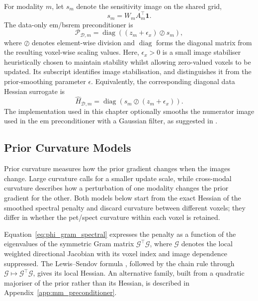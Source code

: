 For modality $m$, let $s_m$ denote the sensitivity image on the shared grid,
\begin{equation}
    s_m
    =
    W_m A_m^\top \bm 1.
    \label{eq:shared_grid_sensitivity}
\end{equation}
The data-only \gls{em}/\gls{bsrem} preconditioner is
\begin{equation}
    \mathcal{P}_{\mathcal D,m}
    =
    \operatorname{diag}\!\left((z_m+\epsilon_x)\oslash s_m\right),
    \label{eq:bsrem_preconditioner}
\end{equation}
where $\oslash$ denotes element-wise division and $\operatorname{diag}$ forms the diagonal matrix from the resulting voxel-wise scaling values. Here, $\epsilon_x>0$ is a small image stabiliser heuristically chosen to maintain stability whilst allowing zero-valued voxels to be updated. Its subscript identifies image stabilisation, and distinguishes it from the prior-smoothing parameter $\epsilon$. Equivalently, the corresponding diagonal data Hessian surrogate is
\begin{equation}
    \widehat H_{\mathcal D,m}
    =
    \operatorname{diag}\!\left(s_m \oslash (z_m+\epsilon_x)\right).
    \label{eq:data_hessian_surrogate}
\end{equation}
The implementation used in this chapter optionally smooths the numerator image used in the \gls{em} preconditioner with a Gaussian filter, as suggested in \cite{ehrhardtFastPETReconstruction2025a}.

\subsection{Prior Curvature Models}
\label{subsec:optimisation_prior_preconditioning}

Prior curvature measures how the prior gradient changes when the images change. Large curvature calls for a smaller update scale, while cross-modal curvature describes how a perturbation of one modality changes the prior gradient for the other. Both models below start from the exact Hessian of the smoothed spectral penalty and discard curvature between different voxels; they differ in whether the \gls{pet}/\gls{spect} curvature within each voxel is retained.

Equation~\eqref{eq:phi_gram_spectral} expresses the penalty as a function of the eigenvalues of the symmetric Gram matrix $\mathcal{G}^\top \mathcal{G}$, where $\mathcal{G}$ denotes the local weighted directional Jacobian with its voxel index and image dependence suppressed. The Lewis--Sendov formula \cite{doi:10.1137/S089547980036838X}, followed by the chain rule through $\mathcal{G}\mapsto \mathcal{G}^\top \mathcal{G}$, gives its local Hessian. An alternative family, built from a quadratic majoriser of the prior rather than its Hessian, is described in Appendix~\ref{app:mm_preconditioner}.

